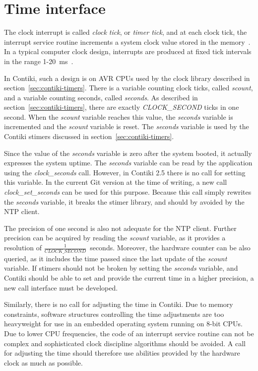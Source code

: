 
\section{Time interface}\label{sec:analysis-time}
The clock interrupt is called {\it{clock tick}}, or {\it{timer tick}}, and at each clock tick,
the interrupt service routine increments a system clock value stored in the memory~\cite{thesis-sync}.
In a typical computer clock design, interrupts are produced at
fixed tick intervals in the range 1-20~ms~\cite{nanokernel}.

In Contiki, such a design is on AVR CPUs used by the clock library described in section~\ref{sec:contiki-timers}.
There is a variable counting clock ticks, called {\it{scount}},
and a variable counting seconds, called {\it{seconds}}.
As described in section~\ref{sec:contiki-timers}, there are
exactly {\it{CLOCK\_SECOND}} ticks in one second.
When the {\it{scount}} variable reaches this value,
the {\it{seconds}} variable is incremented and the {\it{scount}} variable is reset.
The {\it{seconds}} variable is used by the Contiki stimers discussed in section~\ref{sec:contiki-timers}.

Since the value of the {\it{seconds}} variable is zero after the system booted,
it actually expresses the system uptime.
The {\it{seconds}} variable can be read by the application using the {\it{clock\_seconds}} call.
However, in Contiki 2.5 there is no call for setting this variable.
In the current Git version at the time of writing, a new call {\it{clock\_set\_seconds}}
can be used for this purpose.
Because this call simply rewrites the {\it{seconds}} variable, it breaks the stimer library,
and should by avoided by the NTP client.

The precision of one second is also not adequate for the NTP client.
Further precision can be acquired by reading the {\it{scount}} variable,
as it provides a resolution of $\frac{1}{CLOCK\_SECOND}$~seconds.
Moreover, the hardware counter can be also queried, as it includes the time passed since
the last update of the {\it{scount}} variable.
If stimers should not be broken by setting the {\it{seconds}} variable,
and Contiki should be able to set and provide the current time in a higher precision,
a new call interface must be developed.

Similarly, there is no call for adjusting the time in Contiki.
Due to memory constraints, software structures controlling the time adjustments are too heavyweight
for use in an embedded operating system running on 8-bit CPUs.
Due to lower CPU frequencies, the code of an interrupt service routine can not be complex
and sophisticated clock discipline algorithms should be avoided.
A call for adjusting the time should therefore use abilities
provided by the hardware clock as much as possible.
